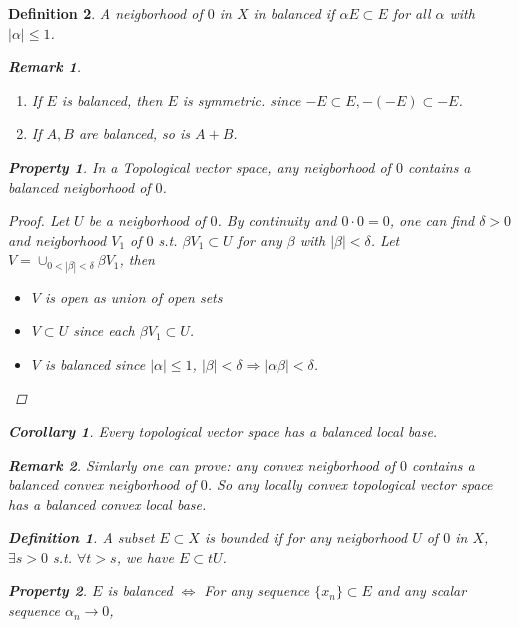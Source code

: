 \documentclass{article}
\newtheorem*{property}{Property}
\newtheorem*{definition}{Definition}
\newtheorem*{remark}{Remark}
\newtheorem*{corollary}{Corollary}
\begin{document}
\begin{definition}
  A neigborhood of $0$ in $X$ in balanced if $\alpha E \subset E$ for all $\alpha$ with $|\alpha| \le 1$.
  \begin{remark} \hfill
    \begin{enumerate}
      \item If $E$ is balanced, then $E$ is symmetric. since 
      $-E \subset E, -(-E) \subset -E$.
      \item If $A, B$ are balanced, so is $A + B$.
    \end{enumerate}
  \end{remark}
  \begin{property}
    In a Topological vector space, any neigborhood of $0$ contains a balanced neigborhood of $0$.
    \begin{proof}
      Let $U$ be a neigborhood of $0$. By continuity and $0 \cdot 0 = 0$, 
      one can find $\delta > 0$ and neigborhood $V_1$ of $0$ 
      s.t. $\beta V_1 \subset U$ for any $\beta$ with $|\beta| < \delta$.
      Let $V = \cup_{0 < |\beta| < \delta}\beta V_1$, then 
      \begin{itemize}
        \item $V$ is open as union of open sets
        \item $V \subset U$ since each $\beta V_1 \subset U$.
        \item $V$ is balanced since $|\alpha| \le 1$, 
              $|\beta| < \delta \Rightarrow |\alpha \beta| < \delta$.
      \end{itemize}
    \end{proof}
  \end{property}
  \begin{corollary}
    Every topological vector space has a balanced local base.
    \begin{remark}
      Simlarly one can prove: any convex neigborhood of $0$ contains a balanced convex neigborhood of $0$.
      So any locally convex topological vector space has a balanced convex local base.
    \end{remark}
  \end{corollary}
  \begin{definition}
    A subset $E \subset X$ is bounded if for any neigborhood $U$ of $0$ in $X$, $\exists s > 0$ s.t. 
    $\forall t > s$, we have $E \subset tU$.
  \end{definition}
  \begin{property}
    $E$ is balanced $\Leftrightarrow$ For any sequence $\{x_n\} \subset E$ and any scalar sequence $\alpha_n \rightarrow 0$,

\end{property}
\end{definition}
\end{document}
